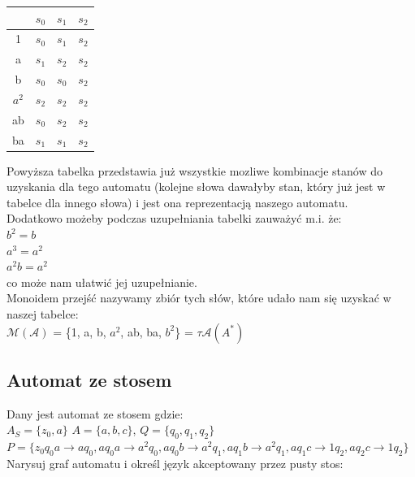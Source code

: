 \documentclass[12pt]{article}
\begin{document}
	\begin{table}[H]
	\centering
		\begin{tabular}{|c|l|l|l|}
			\hline
				          & $s_{0}$ & $s_{1}$ & $s_{2}$ \\ \hline
			1	          & $s_{0}$ & $s_{1}$ & $s_{2}$ \\ \hline
			a            & $s_{1}$ & $s_{2}$ & $s_{2}$ \\ \hline
			b  	          & $s_{0}$ & $s_{0}$ & $s_{2}$ \\ \hline
			$a^2$  & $s_{2}$ & $s_{2}$ & $s_{2}$ \\ \hline
			ab		& $s_{0}$ & $s_{2}$ & $s_{2}$ \\ \hline
			ba         & $s_{1}$ & $s_{1}$ & $s_{2}$ \\ \hline
		\end{tabular}
	\end{table}

	\noindent Powyższa tabelka przedstawia już wszystkie mozliwe kombinacje stanów do uzyskania dla tego automatu (kolejne słowa dawałyby stan, który już jest w tabelce dla innego słowa) i jest ona reprezentacją naszego automatu. \\

	\noindent Dodatkowo możeby podczas uzupełniania tabelki zauważyć m.i. że: \\
	$b^2 = b$ \\
	$a^3 = a^2$ \\
	$a^{2}b = a^2$ \\
	co może nam ułatwić jej uzupełnianie. \\

	\noindent Monoidem przejść nazywamy zbiór tych słów, które udało nam się uzyskać w naszej tabelce: \\
	$\mathcal{M(A)}$ = \{1, a, b, $a^2$, ab, ba, $b^2$\} = $\tau \mathcal{A}(A^{*})$

	\subsection{Automat ze stosem}
	Dany jest automat ze stosem gdzie: \\
	$A_{S} = \{z_{0}, a\}$ $A = \{a, b, c\}$, $Q = \{q_{0}, q_{1}, q_{2}\}$ \\
	$P = \{z_{0}q_{0}a \rightarrow aq_{0}, aq_{0}a \rightarrow a^2q_{0}, aq_{0}b \rightarrow a^2q_{1}, aq_{1}b \rightarrow a^2q_{1}, aq_{1}c \rightarrow 1q_{2}, aq_{2}c \rightarrow 1q_{2}\}$ \\

	\noindent Narysuj graf automatu i określ język akceptowany przez pusty stos: \\
\end{document}
